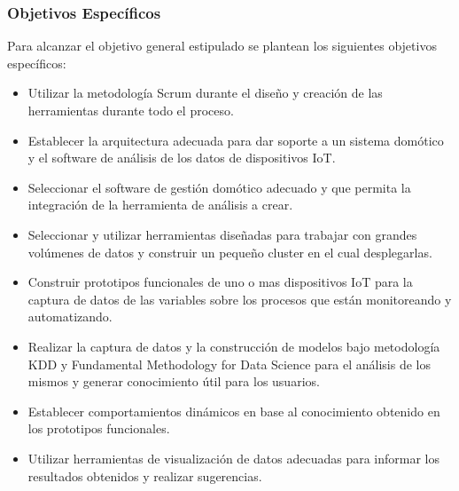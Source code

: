 \subsubsection{Objetivos Específicos}
Para alcanzar el objetivo general estipulado se plantean los siguientes objetivos específicos:
\begin{itemize}
\item Utilizar la metodología Scrum durante el diseño y creación de las herramientas durante todo el proceso. 
\item Establecer la arquitectura adecuada para dar soporte a un sistema domótico y el software de análisis de los datos de dispositivos IoT.
\item Seleccionar el software de gestión domótico adecuado y que permita la integración de la herramienta de análisis a crear.
\item Seleccionar y utilizar herramientas diseñadas para trabajar con grandes volúmenes de datos y construir un pequeño cluster en el cual desplegarlas.
\item Construir prototipos funcionales de uno o mas dispositivos IoT para la captura de datos de las variables sobre los procesos que están monitoreando y automatizando.
\item Realizar la captura de datos y la construcción de modelos bajo metodología KDD y Fundamental Methodology for Data Science para el análisis de los mismos y generar conocimiento útil para los usuarios.
\item Establecer comportamientos dinámicos en base al conocimiento obtenido en los prototipos funcionales.
\item Utilizar herramientas de visualización de datos adecuadas para informar los resultados obtenidos y realizar sugerencias.
\end{itemize}
